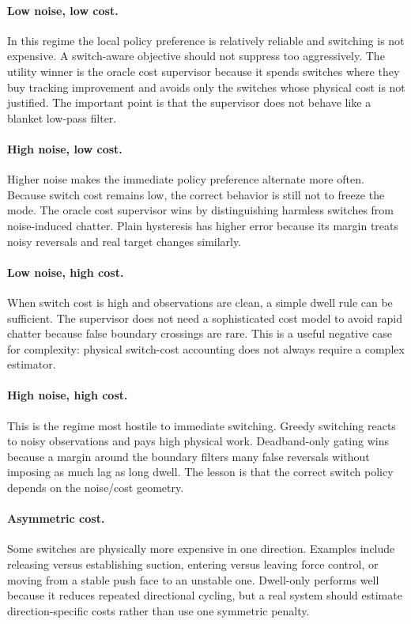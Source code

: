 \documentclass{article}
\begin{document}
\paragraph{Low noise, low cost.}
In this regime the local policy preference is relatively reliable and switching is not expensive.
A switch-aware objective should not suppress too aggressively.
The utility winner is the oracle cost supervisor because it spends switches where they buy tracking improvement and avoids only the switches whose physical cost is not justified.
The important point is that the supervisor does not behave like a blanket low-pass filter.

\paragraph{High noise, low cost.}
Higher noise makes the immediate policy preference alternate more often.
Because switch cost remains low, the correct behavior is still not to freeze the mode.
The oracle cost supervisor wins by distinguishing harmless switches from noise-induced chatter.
Plain hysteresis has higher error because its margin treats noisy reversals and real target changes similarly.

\paragraph{Low noise, high cost.}
When switch cost is high and observations are clean, a simple dwell rule can be sufficient.
The supervisor does not need a sophisticated cost model to avoid rapid chatter because false boundary crossings are rare.
This is a useful negative case for complexity: physical switch-cost accounting does not always require a complex estimator.

\paragraph{High noise, high cost.}
This is the regime most hostile to immediate switching.
Greedy switching reacts to noisy observations and pays high physical work.
Deadband-only gating wins because a margin around the boundary filters many false reversals without imposing as much lag as long dwell.
The lesson is that the correct switch policy depends on the noise/cost geometry.

\paragraph{Asymmetric cost.}
Some switches are physically more expensive in one direction.
Examples include releasing versus establishing suction, entering versus leaving force control, or moving from a stable push face to an unstable one.
Dwell-only performs well because it reduces repeated directional cycling, but a real system should estimate direction-specific costs rather than use one symmetric penalty.
\end{document}
